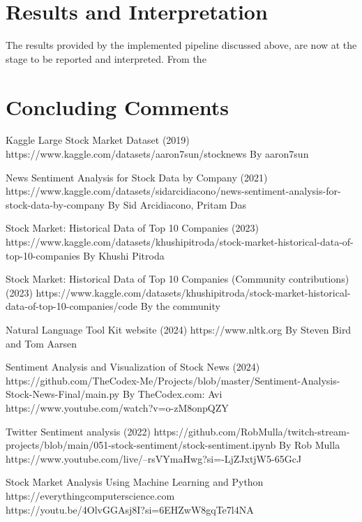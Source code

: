 \documentclass[11pt, a4paper]{article}
\begin{document}
\newpage
\section{Results and Interpretation}
The results provided by the implemented pipeline discussed above, are now at the stage to be reported and interpreted. From the 

\newpage
\section{Concluding Comments}

\newpage
\begin{thebibliography}{9}

Kaggle Large Stock Market Dataset (2019)
https://www.kaggle.com/datasets/aaron7sun/stocknews
By aaron7sun


News Sentiment Analysis for Stock Data by Company (2021)
https://www.kaggle.com/datasets/sidarcidiacono/news-sentiment-analysis-for-stock-data-by-company
By Sid Arcidiacono, Pritam Das

Stock Market: Historical Data of Top 10 Companies (2023)
https://www.kaggle.com/datasets/khushipitroda/stock-market-historical-data-of-top-10-companies
By Khushi Pitroda 

Stock Market: Historical Data of Top 10 Companies (Community contributions) (2023)
https://www.kaggle.com/datasets/khushipitroda/stock-market-historical-data-of-top-10-companies/code
By the community

Natural Language Tool Kit website (2024)
https://www.nltk.org
By Steven Bird and Tom Aarsen

Sentiment Analysis and Visualization of Stock News (2024)
https://github.com/TheCodex-Me/Projects/blob/master/Sentiment-Analysis-Stock-News-Final/main.py
By TheCodex.com: Avi
https://www.youtube.com/watch?v=o-zM8onpQZY

Twitter Sentiment analysis (2022)
https://github.com/RobMulla/twitch-stream-projects/blob/main/051-stock-sentiment/stock-sentiment.ipynb
By Rob Mulla
https://www.youtube.com/live/--rsVYmaHwg?si=-LjZJxtjW5-65GcJ

Stock Market Analysis Using Machine Learning and Python
\\https://everythingcomputerscience.com
\\https://youtu.be/4OlvGGAsj8I?si=6EHZwW8gqTe7l4NA



\end{thebibliography}
\end{document}
